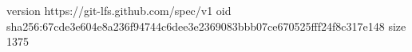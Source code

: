 version https://git-lfs.github.com/spec/v1
oid sha256:67cde3e604e8a236f94744c6dee3e2369083bbb07ce670525fff24f8c317e148
size 1375
